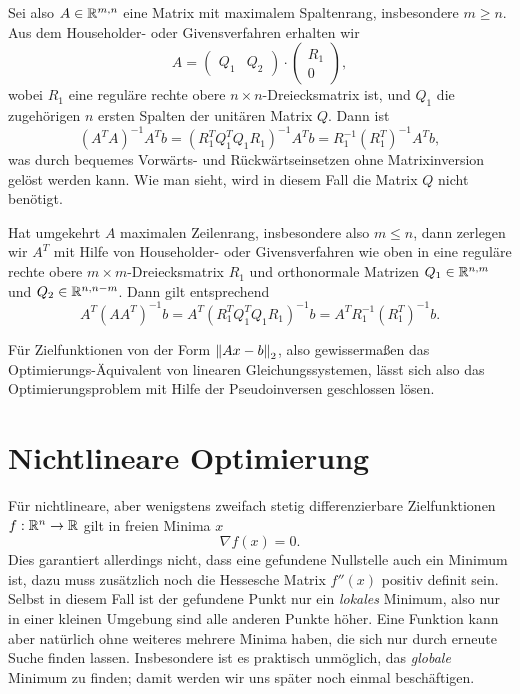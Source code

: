 Sei also $A\in\mathbb{R}^{m,n}$ eine Matrix mit maximalem Spaltenrang,
insbesondere $m \ge n$. Aus dem Householder- oder Givensverfahren
erhalten wir
\begin{equation}
  A = 
  \begin{pmatrix}
    Q_1 & Q_2
  \end{pmatrix}
  \cdot
  \begin{pmatrix}
    R_1\\
    0
  \end{pmatrix},
\end{equation}
wobei $R_1$ eine reguläre rechte obere $n\times n$-Dreiecksmatrix ist,
und $Q_1$ die zugehörigen $n$ ersten Spalten der unitären Matrix $Q$.
Dann ist
\begin{equation}
  (A^TA)^{-1}A^Tb = (R_1^TQ_1^TQ_1 R_1)^{-1}A^Tb =
  R_1^{-1}\left(R_1^T\right)^{-1}A^Tb,
\end{equation}
was durch bequemes Vorwärts- und Rückwärtseinsetzen ohne
Matrixinversion gelöst werden kann. Wie man sieht, wird in diesem Fall
die Matrix $Q$ nicht benötigt.

Hat umgekehrt $A$ maximalen Zeilenrang, insbesondere also $m \le n$,
dann zerlegen wir $A^T$ mit Hilfe von Householder- oder
Givensverfahren wie oben in eine reguläre rechte obere $m\times
m$-Dreiecksmatrix $R_1$ und orthonormale Matrizen $Q_1\in\mathbb{R}^{n,m}$
und $Q_2\in\mathbb{R}^{n,n-m}$. Dann gilt entsprechend
\begin{equation}
  A^T(AA^T)^{-1}b = A^T(R_1^TQ_1^TQ_1 R_1)^{-1}b =
  A^TR_1^{-1}\left(R_1^T\right)^{-1}b.
\end{equation}

Für Zielfunktionen von der Form $\left\lVert{Ax-b}\right\rVert_2$, also gewissermaßen
das Optimierungs-Äquivalent von linearen Gleichungssystemen, lässt
sich also das Optimierungsproblem mit Hilfe der Pseudoinversen
geschlossen lösen.

\section{Nichtlineare Optimierung}

Für nichtlineare, aber wenigstens zweifach stetig differenzierbare
Zielfunktionen $f:\mathbb{R}^n\to \mathbb{R}$ gilt in freien Minima $x$
\begin{equation}
  \label{eq:mingrad}
  \nabla f(x) = 0.
\end{equation}
Dies garantiert allerdings nicht, dass eine gefundene Nullstelle auch
ein Minimum ist, dazu muss zusätzlich noch die Hessesche Matrix
$f''(x)$ positiv definit sein. Selbst in diesem Fall ist der gefundene
Punkt nur ein \emph{lokales} Minimum, also nur in einer kleinen
Umgebung sind alle anderen Punkte höher. Eine Funktion kann aber
natürlich ohne weiteres mehrere Minima haben, die sich nur durch
erneute Suche finden lassen. Insbesondere ist es praktisch unmöglich,
das \emph{globale} Minimum zu finden; damit werden wir uns später noch
einmal beschäftigen.

